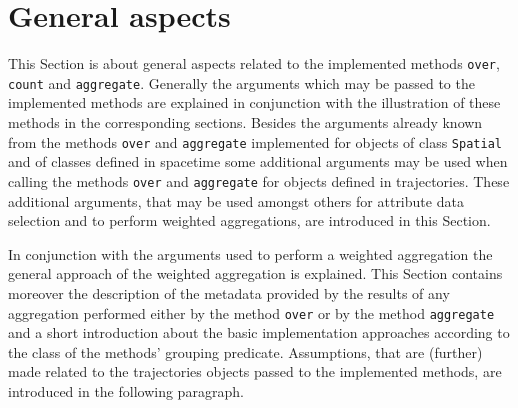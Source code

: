\documentclass[12pt, oneside, a4paper]{scrbook}
\newcommand{\pkg}[1]{{\normalfont\fontseries{b}\selectfont #1}}
\let\code=\texttt
\begin{document}


\section{General aspects}
\label{sec:generalaspects}

This Section is about general aspects related to the implemented methods \code{over}, \code{count} and \code{aggregate}.
Generally the arguments which may be passed to the implemented methods are explained in conjunction with the illustration of these methods in the corresponding sections.
Besides the arguments already known from the methods \code{over} and \code{aggregate} implemented for objects of class \code{Spatial} and of classes defined in \pkg{spacetime} some additional arguments may be used when calling the methods \code{over} and \code{aggregate} for objects defined in \pkg{trajectories}.
These additional arguments, that may be used amongst others for attribute data selection and to perform weighted aggregations, are introduced in this Section.
\par\medskip
In conjunction with the arguments used to perform a weighted aggregation the general approach of the weighted aggregation is explained.
This Section contains moreover the description of the metadata provided by the results of any aggregation performed either by the method \code{over} or by the method \code{aggregate} and
a short introduction about the basic implementation approaches according to the class of the methods' grouping predicate.
Assumptions, that are (further) made related to the \pkg{trajectories} objects passed to the implemented methods, are introduced in the following paragraph.
\par\medskip
\end{document}
